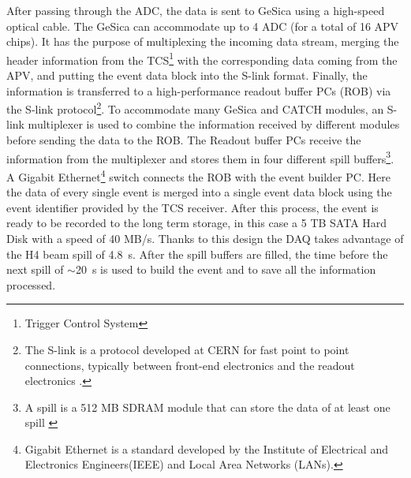 After passing through the ADC, the data is sent to GeSica using a high-speed optical cable. The GeSica can accommodate up to 4 ADC (for a total of 16 APV chips). It has the purpose of multiplexing the incoming data stream, merging the header information from the TCS\footnote{Trigger Control System} with the corresponding data coming from the APV, and putting the event data block into the S-link format. Finally, the information is transferred to a high-performance readout buffer PCs (ROB) via the S-link protocol\footnote{The S-link is a protocol developed at CERN for fast point to point connections, typically between front-end electronics and the readout electronics \cite{s-link}.}. To accommodate many GeSica and CATCH modules, an S-link multiplexer is used to combine the information received by different modules before sending the data to the ROB. The Readout buffer PCs receive the information from the multiplexer and stores them in four different spill buffers\footnote{A spill is a 512 MB SDRAM module that can store the data of at least one spill \cite{COMPASS-daq}}. A Gigabit Ethernet\footnote{Gigabit Ethernet is a standard developed by the Institute of Electrical and Electronics Engineers(IEEE) and Local Area Networks (LANs).} switch connects the ROB with the event builder PC. Here the data of every single event is merged into a single event data block using the event identifier provided by the TCS receiver. After this process, the event is ready to be recorded to the long term storage, in this case a 5 TB SATA Hard Disk with a speed of 40 MB/s. Thanks to this design the DAQ takes advantage of the H4 beam spill of \SI{4.8}{\second}. After the spill buffers are filled, the time before the next spill of $\sim$\SI{20}{\second} is used to build the event and to save all the information processed.

